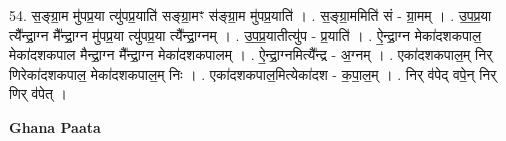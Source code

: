 \documentclass[17pt]{extarticle}
\begin{document}
54. स॒ङ्ग्रा॒म मु॑पप्र॒या त्यु॑पप्र॒याति॑ सङ्ग्रा॒मꣳ स॑ङ्ग्रा॒म मु॑पप्र॒याति॑ । . स॒ङ्ग्रा॒ममिति॑ सं - ग्रा॒मम् । . उ॒प॒प्र॒या त्यै᳚न्द्रा॒ग्न मै᳚न्द्रा॒ग्न मु॑पप्र॒या त्यु॑पप्र॒या त्यै᳚न्द्रा॒ग्नम् । . उ॒प॒प्र॒यातीत्यु॑प - प्र॒याति॑ । . ऐ॒न्द्रा॒ग्न मेका॑दशकपाल॒ मेका॑दशकपाल मैन्द्रा॒ग्न मै᳚न्द्रा॒ग्न मेका॑दशकपालम् । . ऐ॒न्द्रा॒ग्नमित्यै᳚न्द्र - अ॒ग्नम् । . एका॑दशकपाल॒म् निर् णिरेका॑दशकपाल॒ मेका॑दशकपाल॒म् निः । . एका॑दशकपाल॒मित्येका॑दश - क॒पा॒ल॒म् । . निर् व॑पेद् वपे॒न् निर् णिर् व॑पेत् । \newline

\textbf{Ghana Paata } \newline
\end{document}

